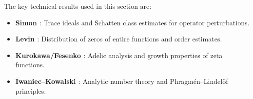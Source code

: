 The key technical results used in this section are:
\begin{itemize}
\item \textbf{Simon \cite{simon2005}}: Trace ideals and Schatten class estimates for operator perturbations.
\item \textbf{Levin \cite{levin1996}}: Distribution of zeros of entire functions and order estimates.
\item \textbf{Kurokawa/Fesenko \cite{fesenko2021}}: Adelic analysis and growth properties of zeta functions.
\item \textbf{Iwaniec–Kowalski \cite{IK2004}}: Analytic number theory and Phragmén–Lindelöf principles.
\end{itemize}
